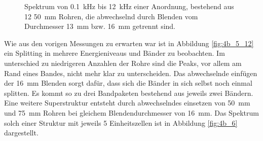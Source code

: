 \begin{figure}
\begin{subfigure}{0.34\textwidth}
\end{subfigure}
\caption{Spektrum von 0.1~kHz bis 12~kHz einer Anordnung, bestehend aus 12 50~mm Rohren, die abwechselnd durch Blenden vom Durchmesser 13~mm bzw. 16~mm getrennt sind.}
\label{fig:4b_5_12_alternating}
\end{figure}
Wie aus den vorigen Messungen zu erwarten war ist in Abbildung \ref{fig:4b_5_12} ein Splitting in mehrere Energieniveaus und Bänder zu beobachten. 
Im unterschied zu niedrigeren Anzahlen der Rohre sind die Peaks, vor allem am Rand eines Bandes, nicht mehr klar zu unterscheiden.
Das abwechselnde einfügen der 16~mm Blenden sorgt dafür, dass sich die Bänder in sich selbst noch einmal splitten. 
Es kommt so zu drei Bandpaketen bestehend aus jeweils zwei Bändern.
Eine weitere Superstruktur entsteht durch abwechselndes einsetzen von 50~mm und 75~mm Rohren bei gleichem Blendendurchmesser von 16~mm. Das Spektrum solch einer Struktur mit jeweils 5 Einheitszellen ist in Abbildung \ref{fig:4b_6} dargestellt.
